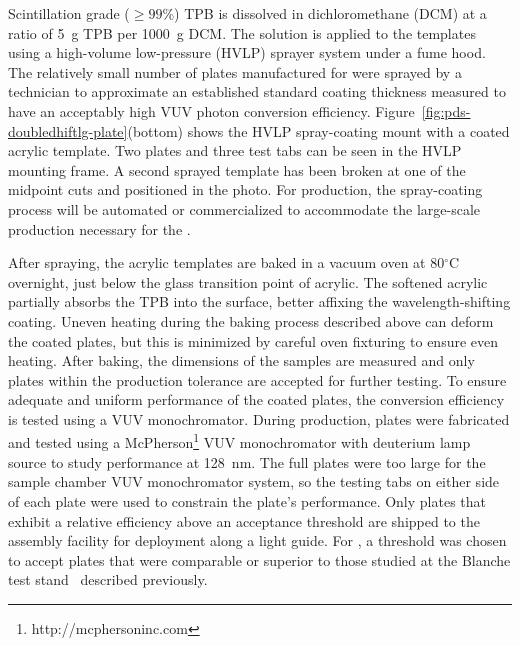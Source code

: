 Scintillation grade ($\ge 99$\%) TPB is dissolved in dichloromethane (DCM) at a ratio of \SI{5}{g} TPB per \SI{1000}{g} DCM. The solution is applied to the templates using a high-volume low-pressure (HVLP) sprayer system under a fume hood. The relatively small number of plates manufactured for  were sprayed by a technician to approximate an established standard coating thickness measured to have an acceptably high VUV photon conversion efficiency. Figure~\ref{fig:pds-doubledhiftlg-plate}(bottom) shows the HVLP spray-coating mount with a coated acrylic template. Two plates and three test tabs can be seen in the HVLP mounting frame. A second sprayed template has been broken at one of the midpoint cuts and positioned in the photo. For  production, the spray-coating process will be automated or commercialized to accommodate the large-scale production necessary for the  .

After spraying, the acrylic templates are baked in a vacuum oven at 80$^{\circ}$C overnight, just below the glass transition point of acrylic. The softened acrylic partially absorbs the TPB into the surface, better affixing the wavelength-shifting coating. Uneven heating during the baking process described above can deform the coated plates, but this is minimized by careful oven fixturing to ensure even heating. After baking, the dimensions of the samples are measured and only plates within the production tolerance are accepted for further testing.
To ensure adequate and uniform performance of the coated plates, the conversion efficiency is tested using a VUV monochromator. During  production, plates were fabricated and tested 
using a McPherson\footnote{http://mcphersoninc.com} VUV monochromator with deuterium lamp source to study performance at 128~nm. The full plates were too large for the sample chamber
VUV monochromator system, so the testing tabs on either side of each plate were used to constrain the plate's performance. 
Only plates that exhibit a relative efficiency above an acceptance threshold are shipped to the assembly facility for deployment along a light guide. For , a threshold was chosen to accept plates that were comparable or superior to those studied at the Blanche test stand~\cite{bib:DoubleShiftLG-NIM-171113} described previously.

